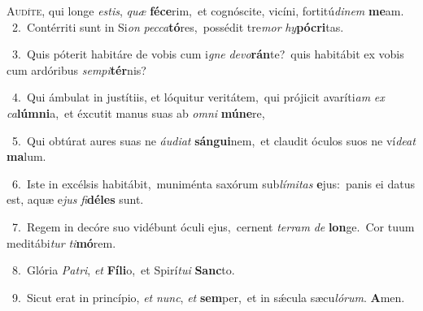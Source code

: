 \lettrine{\initial\textcolor{\initialcolor}{A}}{udíte,} qui longe \textit{es}\-\textit{tis}, \textit{quæ} \textbf{fé}\-\textbf{ce}rim,~\star et cognóscite, vicíni, fortitú\-\textit{di}\-\textit{nem} \textbf{me}\-am.\\
{\numbfont\textcolor{\numbcolor}{~2.}}~Contérriti sunt in Si\textit{on} \textit{pec}\-\textit{ca}\textbf{tó}res,~\star possédit tre\textit{mor} \textit{hy}\-\textbf{pó}\textbf{cri}tas.\par
{\numbfont\textcolor{\numbcolor}{~3.}}~Quis póterit habitáre de vobis cum i\textit{gne} \textit{de}\-\textit{vo}\textbf{rán}te?~\star quis habitábit ex vobis cum ardóribus \textit{sem}\-\textit{pi}\textbf{tér}nis?\par
{\numbfont\textcolor{\numbcolor}{~4.}}~Qui ámbulat in justítiis, et lóquitur veritátem,~\dagger qui prójicit avaríti\textit{am} \textit{ex} \textit{ca}\-\textbf{lúm}\textbf{ni}a,~\star et éxcutit manus suas ab \textit{om}\-\textit{ni} \textbf{mú}\-\textbf{ne}re,\par
{\numbfont\textcolor{\numbcolor}{~5.}}~Qui obtúrat aures suas ne \textit{áu}\-\textit{di}\textit{at} \textbf{sán}\-\textbf{gui}nem,~\star et claudit óculos suos ne ví\-\textit{de}\-\textit{at} \textbf{ma}\-lum.\par
{\numbfont\textcolor{\numbcolor}{~6.}}~Iste in excélsis habitábit,~\dagger muniménta saxórum sub\-\textit{lí}\-\textit{mi}\textit{tas} \textbf{e}\-jus:~\star panis ei datus est, aquæ e\textit{jus} \textit{fi}\-\textbf{dé}\textbf{les} sunt.\par
{\numbfont\textcolor{\numbcolor}{~7.}}~Regem in decóre suo vidébunt óculi ejus,~\dagger cernent \textit{ter}\-\textit{ram} \textit{de} \textbf{lon}\-ge.~\star Cor tuum meditábi\textit{tur} \textit{ti}\-\textbf{mó}rem.\par
{\numbfont\textcolor{\numbcolor}{~8.}}~Glória \textit{Pa}\-\textit{tri}, \textit{et} \textbf{Fí}\-\textbf{li}o,~\star et Spirí\-\textit{tu}\-\textit{i} \textbf{Sanc}\-to.\par
{\numbfont\textcolor{\numbcolor}{~9.}}~Sicut erat in princípio, \textit{et} \textit{nunc}\-, \textit{et} \textbf{sem}\-per,~\star et in sǽcula sæcu\-\textit{ló}\-\textit{rum}. \textbf{A}\-men.\par
